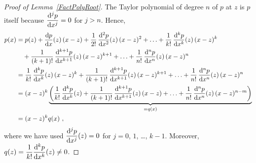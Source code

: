 \begin{proof}[Proof of Lemma~\ref{FactPolyRoot}]
The Taylor polynomial of degree $n$ of $p$ at $z$ is $p$ itself
because $\displaystyle \frac{\mathrm{d}^{j}{p}}{\mathrm{d}{x}^{j}} = 0$ for $j>n$.  Hence,
\begin{align*}
p(x) &= p(z) + \frac{\mathrm{d}p}{\mathrm{d}{x}}(z)\,(x-z) +
\frac{1}{2!}\,\frac{\mathrm{d}^{2}{p}}{\mathrm{d}{x}^{2}}(z)\,(x-z)^2
+ \ldots + \frac{1}{k!}\,\frac{\mathrm{d}^{k}{p}}{\mathrm{d}{x}^{k}}(z)\,(x-z)^k \\
&\quad + \frac{1}{(k+1)!}\,\frac{\mathrm{d}^{k+1}{p}}{\mathrm{d}{x}^{k+1}}(z)\,(x-z)^{k+1}
+ \ldots + \frac{1}{n!}\,\frac{\mathrm{d}^{n}{p}}{\mathrm{d}{x}^{n}}(z)\,(x-z)^n \\
&= \frac{1}{k!}\,\frac{\mathrm{d}^{k}{p}}{\mathrm{d}{x}^{k}}(z)\,(x-z)^k
+ \frac{1}{(k+1)!}\,\frac{\mathrm{d}^{k+1}{p}}{\mathrm{d}{x}^{k+1}}(z)\,(x-z)^{k+1}
+ \ldots + \frac{1}{n!}\,\frac{\mathrm{d}^{n}{p}}{\mathrm{d}{x}^{n}}(z)\,(x-z)^n \\
&= (x-z)^k
\underbrace{\left( \frac{1}{k!}\,\frac{\mathrm{d}^{k}{p}}{\mathrm{d}{x}^{k}}(z)
+ \frac{1}{(k+1)!}\,\frac{\mathrm{d}^{k+1}{p}}{\mathrm{d}{x}^{k+1}}(z)\,(x-z)
+ \ldots + \frac{1}{n!}\,\frac{\mathrm{d}^{n}{p}}{\mathrm{d}{x}^{n}}(z)\,(x-z)^{n-m}\right)}_{=q(x)} \\
&= (x-z)^k q(x) \ ,
\end{align*}
where we have used $\displaystyle \frac{\mathrm{d}^{j}{p}}{\mathrm{d}{x}^{j}}(z)=0$ for $j=0$,
$1$, \ldots, $k-1$.  Moreover,
$\displaystyle q(z) = \frac{1}{k!} \frac{\mathrm{d}^{k}{p}}{\mathrm{d}{x}^{k}}(z) \neq 0$.
\end{proof}

